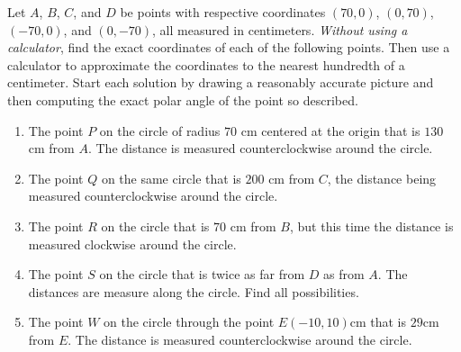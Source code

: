 \documentclass{ximera}
\begin{document}
\begin{question}\label{QPPdfeer333}
Let $A$, $B$, $C$, and $D$ be points with respective coordinates $(70,0)$, $(0,70)$, $(-70,0)$, and $(0,-70)$, all measured in centimeters. \emph{Without using a calculator}, find the exact coordinates of each of the following points. Then use a calculator to approximate the coordinates to the nearest hundredth of a centimeter. Start each solution by drawing a reasonably accurate picture and then computing the exact polar angle of the point so described.

\begin{enumerate}
\item The point $P$ on the circle of radius $70$ cm centered at the origin that is $130$ cm from $A$. The distance is measured counterclockwise around the circle.


\item The point $Q$ on the same circle that is $200$ cm from $C$, the distance being measured counterclockwise around the circle.

\item The point $R$ on the circle that is $70$ cm from $B$, but this time the distance is measured clockwise around the circle.

\item The point $S$ on the circle that is twice as far from $D$ as from $A$. The distances are measure along the circle. Find all possibilities.

\item The point $W$ on the circle through the point $E(-10,10)$cm that is $29$cm from $E$. The distance is measured counterclockwise around the circle.



\end{enumerate}
\end{question}
\end{document}
